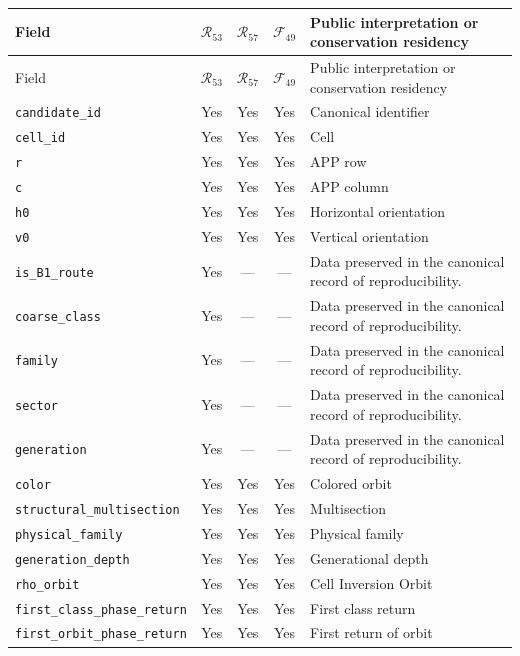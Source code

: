 \begingroup
\small
\useOriginalUrlSetting
\setlength{\LTpre}{0.5\baselineskip}
\setlength{\LTpost}{0.5\baselineskip}
\begin{longtable}{p{}ccc p{}}
\hline
Field & \(\mathcal R_{53}\) & \(\mathcal R_{57}\) & \(\mathcal F_{49}\) & Public interpretation or conservation residency \\
\hline
\endfirsthead
\hline
Field & \(\mathcal R_{53}\) & \(\mathcal R_{57}\) & \(\mathcal F_{49}\) & Public interpretation or conservation residency \\
\hline
\endhead
\nolinkurl{candidate_id} & Yes & Yes & Yes & Canonical identifier \\
\nolinkurl{cell_id} & Yes & Yes & Yes & Cell \\
\nolinkurl{r} & Yes & Yes & Yes & APP row \\
\nolinkurl{c} & Yes & Yes & Yes & APP column \\
\nolinkurl{h0} & Yes & Yes & Yes & Horizontal orientation \\
\nolinkurl{v0} & Yes & Yes & Yes & Vertical orientation \\
\nolinkurl{is_B1_route} & Yes & --- & --- & Data preserved in the canonical record of reproducibility. \\
\nolinkurl{coarse_class} & Yes & --- & --- & Data preserved in the canonical record of reproducibility. \\
\nolinkurl{family} & Yes & --- & --- & Data preserved in the canonical record of reproducibility. \\
\nolinkurl{sector} & Yes & --- & --- & Data preserved in the canonical record of reproducibility. \\
\nolinkurl{generation} & Yes & --- & --- & Data preserved in the canonical record of reproducibility. \\
\nolinkurl{color} & Yes & Yes & Yes & Colored orbit \\
\nolinkurl{structural_multisection} & Yes & Yes & Yes & Multisection \\
\nolinkurl{physical_family} & Yes & Yes & Yes & Physical family \\
\nolinkurl{generation_depth} & Yes & Yes & Yes & Generational depth \\
\nolinkurl{rho_orbit} & Yes & Yes & Yes & Cell Inversion Orbit \\
\nolinkurl{first_class_phase_return} & Yes & Yes & Yes & First class return \\
\nolinkurl{first_orbit_phase_return} & Yes & Yes & Yes & First return of orbit \\

\end{longtable}
